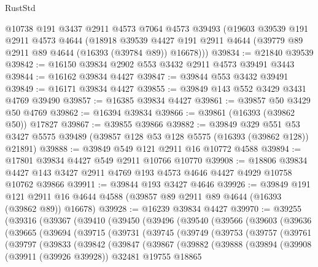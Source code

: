 \begin{lexlean}{RustStd}
\begin{coremodule}
    @10738
    @191
    @3437
    @2911
    @4573
    @7064
    @4573
    @39493
    (@19603
      @39539
      @191
      @2911
      @4573
      @4644
      (@18918
        @39539
        @4427
        @191
        @2911
        @4644
        (@39779 @89 @2911 @89 @4644 (@16393 (@39784 @89)) @16678)))
@39834 := @21840 @39539
@39842 := @16150 @39834 @2902 @553 @3432 @2911 @4573 @39491 @3443
@39844 := @16162 @39834 @4427
@39847 := @39844 @553 @3432 @39491
@39849 := @16171 @39834 @4427
@39855 := @39849 @143 @552 @3429 @3431 @4769 @39490
@39857 := @16385 @39834 @4427
@39861 := @39857 @50 @3429 @50 @4769
@39862 := @16394 @39834
@39866 := @39861 (@16393 (@39862 @50)) @17827
@39867 := @39855 @39866
@39882 := @39849
    @329
    @551
    @53
    @3427
    @5575
    @39489
    (@39857 @128 @53 @128 @5575 (@16393 (@39862 @128)) @21891)
@39888 := @39849 @549 @121 @2911 @16 @10772 @4588
@39894 := @17801 @39834 @4427 @549 @2911 @10766 @10770
@39908 := @18806
    @39834
    @4427
    @143
    @3427
    @2911
    @4769
    @193
    @4573
    @4646
    @4427
    @4929
    @10758
    @10762
    @39866
@39911 := @39844 @193 @3427 @4646
@39926 := @39849
    @191
    @121
    @2911
    @16
    @4644
    @4588
    (@39857 @89 @2911 @89 @4644 (@16393 (@39862 @89)) @16678)
@39928 := @16239 @39834 @4427
@39970 := @39255
    (@39316
      (@39367
        (@39410
          (@39450
            (@39496
              (@39540
                (@39566
                  (@39603
                    (@39636
                      (@39665
                        (@39694
                          (@39715
                            (@39731
                              (@39745
                                (@39749
                                  (@39753
                                    (@39757
                                      (@39761
                                        (@39797
                                          (@39833
                                            (@39842
                                              (@39847
                                                (@39867
                                                  (@39882
                                                    (@39888
                                                      (@39894
                                                        (@39908
                                                          (@39911 (@39926 @39928))
                                                          @32481
                                                          @19755
                                                          @18865

\end{coremodule}
\end{lexlean}
